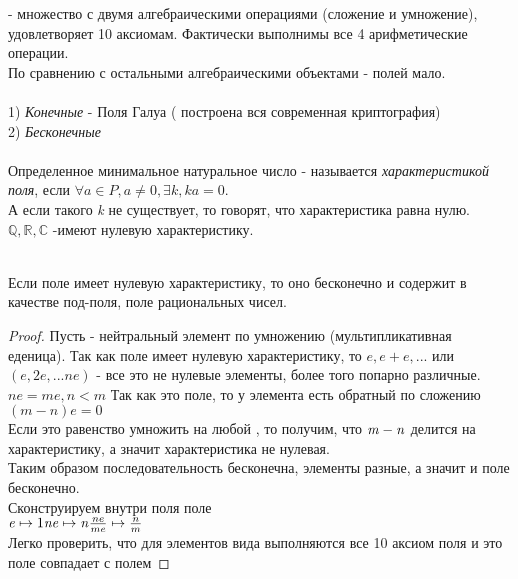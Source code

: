  - множество с двумя алгебраическими операциями (сложение и умножение),
удовлетворяет 10 аксиомам. Фактически выполнимы все 4 арифметические операции.\\

По сравнению с остальными алгебраическими объектами - полей мало. \\

\\
1) {\emph {Конечные}} - Поля Галуа ( построена вся современная криптография)\\
2) {\emph {Бесконечные}} \\

\\
Определенное минимальное натуральное число  - называется {\emph
{характеристикой поля}}, если $\forall \mathit{a} \in \mathit {P,a} \neq 0,
\exists \mathit {k}, \mathit{ka} = 0 $. \\
А если такого {\emph {k}} не существует, то говорят, что характеристика равна
нулю.\\

$\mathbb{Q, R, C}$ -имеют нулевую характеристику.\\

 \\

\begin{theorem}
  Если поле имеет нулевую характеристику, то оно бесконечно и содержит в
  качестве под-поля, поле рациональных чисел.
\end{theorem}

\begin{proof}
  Пусть  - нейтральный элемент по умножению (мультипликативная еденица).
  Так как поле имеет нулевую характеристику, то $\mathit {e, e+e, ...}$ или
  $\mathit {(e, 2e, ... ne)}$ - все это не нулевые элементы, более того попарно
  различные.\\
  $\mathit {ne = me, n < m}$ Так как это поле, то у элемента  есть
  обратный по сложению $\mathit {(m-n)e=0}$ \\
  Если это равенство умножить на любой , то получим, что $\mathit {m-n}$ делится на
  характеристику, а значит характеристика не нулевая.\\
  Таким образом последовательность бесконечна, элементы разные, а значит и поле
  бесконечно.\\
  Сконструируем внутри поля  поле  \\
  $\mathit {e} \mapsto 1 \\
  \mathit {ne} \mapsto \mathit {n} \\
  \frac{ne}{me} \mapsto \frac{n}{m}$ \\

  Легко проверить, что для элементов вида  выполняются все 10 аксиом
  поля и это поле совпадает с полем 
  \end{proof}

